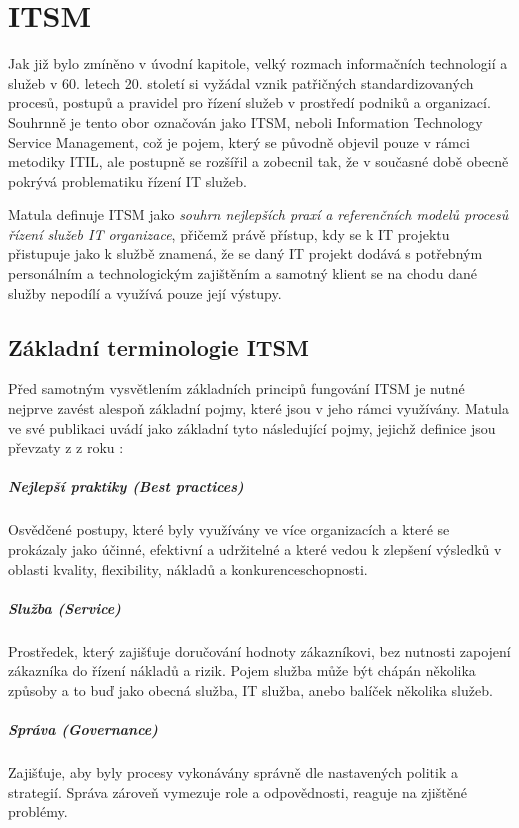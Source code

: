 \documentclass[
  digital,     %
  twoside,     %
  lof,         %
  lot,         %
]{fithesis4}
\begin{document}
\chapter{ITSM}
Jak již bylo zmíněno v úvodní kapitole, velký rozmach informačních technologií a služeb v 60. letech 20. století si vyžádal vznik patřičných standardizovaných procesů, postupů a pravidel pro řízení služeb v prostředí podniků a organizací. Souhrnně je tento obor označován jako ITSM, neboli Information Technology Service Management, což je pojem, který se původně objevil pouze v rámci metodiky ITIL, ale postupně se rozšířil a zobecnil tak, že v současné době obecně pokrývá problematiku řízení IT služeb.\parencite[s.~20]{Matula2017} 

Matula definuje ITSM jako \textit{souhrn nejlepších praxí a referenčních modelů procesů řízení služeb IT organizace}, přičemž právě přístup, kdy se k IT projektu přistupuje jako k službě znamená, že se daný IT projekt dodává s potřebným personálním a technologickým zajištěním a samotný klient se na chodu dané služby nepodílí a využívá pouze její výstupy.\parencite[s.~20-22]{Matula2017}

\section{Základní terminologie ITSM}
Před samotným vysvětlením základních principů fungování ITSM je nutné nejprve zavést alespoň základní pojmy, které jsou v jeho rámci využívány. Matula ve své publikaci  uvádí jako základní tyto následující pojmy, jejichž definice jsou převzaty z  z roku \citeyear{SyFvQA11lk1OaIec}:
\paragraph{Nejlepší praktiky (Best practices)}
Osvědčené postupy, které byly využívány ve více organizacích a které se prokázaly jako účinné, efektivní a udržitelné a které vedou k zlepšení výsledků v oblasti kvality, flexibility, nákladů a konkurenceschopnosti.
\paragraph{Služba (Service)}
Prostředek, který zajišťuje doručování hodnoty zákazníkovi, bez nutnosti zapojení zákazníka do řízení nákladů a rizik. Pojem služba může být chápán několika způsoby a to buď jako obecná služba, IT služba, anebo balíček několika služeb. 
\paragraph{Správa (Governance)}
Zajišťuje, aby byly procesy vykonávány správně dle nastavených politik a strategií. Správa zároveň vymezuje role a odpovědnosti, reaguje na zjištěné problémy.
\end{document}
